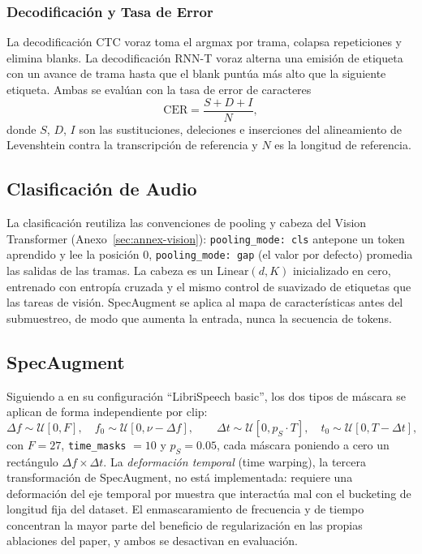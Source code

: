 \subsubsection{Decodificación y Tasa de Error}

La decodificación CTC voraz toma el argmax por trama, colapsa repeticiones y elimina blanks. La decodificación RNN-T voraz alterna una emisión de etiqueta con un avance de trama hasta que el blank puntúa más alto que la siguiente etiqueta. Ambas se evalúan con la tasa de error de caracteres
\begin{equation}
\mathrm{CER} = \frac{S + D + I}{N},
\label{eq:audio-cer}
\end{equation}
donde $S$, $D$, $I$ son las sustituciones, deleciones e inserciones del alineamiento de Levenshtein contra la transcripción de referencia y $N$ es la longitud de referencia.

\subsection{Clasificación de Audio}

La clasificación reutiliza las convenciones de pooling y cabeza del Vision Transformer (Anexo~\ref{sec:annex-vision}): \texttt{pooling\_mode: cls} antepone un token aprendido y lee la posición 0, \texttt{pooling\_mode: gap} (el valor por defecto) promedia las salidas de las tramas. La cabeza es un $\mathrm{Linear}(d, K)$ inicializado en cero, entrenado con entropía cruzada y el mismo control de suavizado de etiquetas que las tareas de visión. SpecAugment se aplica al mapa de características antes del submuestreo, de modo que aumenta la entrada, nunca la secuencia de tokens.

\subsection{SpecAugment}

Siguiendo a \citet{Park2019} en su configuración ``LibriSpeech basic'', los dos tipos de máscara se aplican de forma independiente por clip:
\begin{equation}
\Delta f \sim \mathcal{U}[0, F], \quad f_0 \sim \mathcal{U}[0, \nu - \Delta f],
\qquad
\Delta t \sim \mathcal{U}[0, p_S \cdot T], \quad t_0 \sim \mathcal{U}[0, T - \Delta t],
\label{eq:audio-specaugment}
\end{equation}
con $F = 27$, \texttt{time\_masks} $= 10$ y $p_S = 0.05$, cada máscara poniendo a cero un rectángulo $\Delta f \times \Delta t$. La \emph{deformación temporal} (time warping), la tercera transformación de SpecAugment, no está implementada: requiere una deformación del eje temporal por muestra que interactúa mal con el bucketing de longitud fija del dataset. El enmascaramiento de frecuencia y de tiempo concentran la mayor parte del beneficio de regularización en las propias ablaciones del paper, y ambos se desactivan en evaluación.

